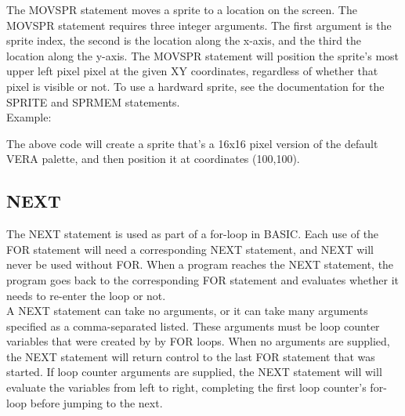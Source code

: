 The {\ttfamily MOVSPR} statement moves a sprite to a location on the screen.
The {\ttfamily MOVSPR} statement requires three integer arguments.  The first
argument is the sprite index, the second is the location along the x-axis, and
the third the location along the y-axis.  The {\ttfamily MOVSPR} statement will
position the sprite's most upper left pixel pixel at the given XY coordinates,
regardless of whether that pixel is visible or not.  To use a hardward sprite,
see the documentation for the {\ttfamily SPRITE} and {\ttfamily SPRMEM}
statements.\\

Example:\\


The above code will create a sprite that's a 16x16 pixel version of the default
VERA palette, and then position it at coordinates (100,100).\\

\subsection{NEXT}

The {\ttfamily NEXT} statement is used as part of a for-loop in BASIC.  Each
use of the {\ttfamily FOR} statement will need a corresponding {\ttfamily NEXT}
statement, and {\ttfamily NEXT} will never be used without {\ttfamily FOR}.
When a program reaches the {\ttfamily NEXT} statement, the program goes back to
the corresponding {\ttfamily FOR} statement and evaluates whether it needs to
re-enter the loop or not.\\

A {\ttfamily NEXT} statement can take no arguments, or it can take many
arguments specified as a comma-separated listed.  These arguments must be loop
counter variables that were created by by {\ttfamily FOR} loops.   When no
arguments are supplied, the {\ttfamily NEXT} statement will return control to
the last {\ttfamily FOR} statement that was started.  If loop counter arguments
are supplied, the {\ttfamily NEXT} statement will will evaluate the variables
from left to right, completing the first loop counter's for-loop before jumping
to the next.\\

